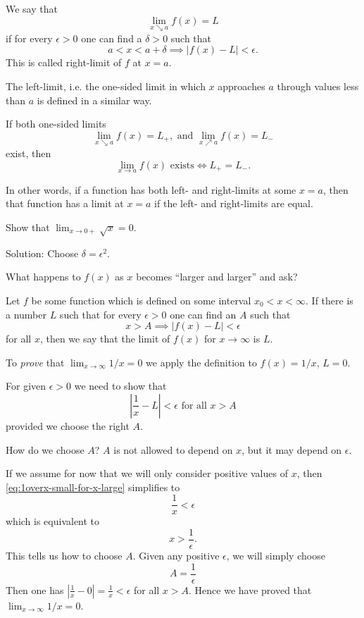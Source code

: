 \documentclass[calc1-main.tex]{subfiles}
\begin{document}
\begin{definition}
  We say that
  \begin{equation}\label{eq:one-sided-lim-formulation}
    \lim_{x\searrow a} f(x) = L
  \end{equation}
  if for every $\epsilon>0$ one can find a $\delta>0$ such that
  \[
  a<x<a+\delta \implies |f(x)-L|<\epsilon.
  \]
  This is called right-limit of $f$ at $x=a$.
\end{definition}

The left-limit, i.e. the one-sided limit in which $x$ approaches $a$
through values less than $a$ is defined in a similar way.

\begin{theorem}
If both one-sided limits
\[
\lim_{x\searrow a} f(x) = L_{+}, \text{ and } \lim_{x\nearrow a} f(x) =
L_{-}
\]
exist, then
\[
\lim_{x\to a} f(x) \text{ exists} \iff L_{+}=L_{-}.
\]
\end{theorem}

In other words, if a function has both left- and right-limits at some
$x=a$, then that function has a limit at $x=a$ if the left- and
right-limits are equal.

\begin{example}
    Show that $\lim_{x \to 0+} \sqrt{x} = 0$.

    Solution: Choose $\delta = \epsilon^2$.
\end{example}

What happens to $f(x)$ as $x$ becomes ``larger and larger'' and ask?
\begin{definition}
  Let $f$ be some function which is defined on some interval $x_0<x<\infty$.
  If there is a number $L$ such that for every $\epsilon>0$ one can find
  an $A$ such that
  \[
  x>A \implies |f(x) - L| <\epsilon
  \]
  for all $x$, then we say that the limit of $f(x)$ for $x\to\infty$ is $L$.
\end{definition}

\begin{example}
  To \emph{prove} that $\lim_{x\to\infty}1/x = 0$ we apply the definition to
  $f(x) = 1/x$, $L=0$.

  For given $\epsilon>0$ we need to show that
  \begin{equation}\label{eq:1overx-small-for-x-large}
    \left|\frac1x - L\right|<\epsilon \text{ for all } x>A
  \end{equation}
  provided we choose the right $A$.

  How do we choose $A$?  $A$ is not allowed to depend on $x$, but it may
  depend on $\epsilon$.

  If we assume for now that we will only consider positive values of $x$,
  then \eqref{eq:1overx-small-for-x-large} simplifies to
  \[
  \frac 1x<\epsilon
  \]
  which is equivalent to
  \[
  x>\frac1\epsilon.
  \]
  This tells us how to choose $A$.  Given any positive $\epsilon$, we will
  simply choose
  \[
  A=\frac1\epsilon
  \]
  Then one has $|\frac1x-0| = \frac1x <\epsilon$ for all $x>A$.  Hence we
  have proved that $\lim_{x\to\infty}1/x=0$.
\end{example}
\end{document}
